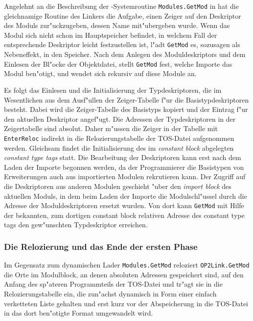 Angelehnt an die Beschreibung der \oberon-Systemroutine {\tt Modules.GetMod}
in \cite[S.~867f]{oberonSystem} hat die gleichnamige Routine des Linkers
die Aufgabe, einen Zeiger auf den Deskriptor des Moduls zur"uckzugeben,
dessen Name mit"ubergeben wurde.
Wenn das Modul sich nicht schon im Hauptspeicher befindet, in welchem Fall
der entsprechende Deskriptor leicht festzustellen ist, l"adt {\tt GetMod} es,
sozusagen als Nebeneffekt, in den Speicher.
Nach dem Anlegen des Moduldeskriptors und dem Einlesen der Bl"ocke der
Objektdatei, stellt {\tt GetMod} fest, welche Importe das Modul ben"otigt,
und wendet sich rekursiv auf diese Module an.

Es folgt das Einlesen und die Initialisierung der Typdeskriptoren, die
im Wesentlichen aus dem Ausf"ullen der Zeiger-Tabelle f"ur die Basistypdeskriptoren
besteht.
Dabei wird die Zeiger-Tabelle des Basistyps kopiert und der Eintrag f"ur
den aktuellen Deskriptor angef"ugt.
Die Adressen der Typdeskriptoren in der Zeigertabelle sind absolut.
Daher m"ussen die Zeiger in der Tabelle mit {\tt EnterReloc} indirekt in die
Relozierungstabelle der TOS-Datei aufgenommen werden.
Gleichsam findet die Initialisierung des im {\it constant block\/} abgelegten
{\it constant type tags\/} statt.
Die Bearbeitung der Deskriptoren kann erst nach dem Laden der Importe
begonnen werden, da der Programmierer die Basistypen von Erweiterungen auch
aus importierten Modulen rekrutieren kann.
Der Zugriff auf die Deskriptoren aus anderen Modulen geschieht "uber den
{\it import block\/} des aktuellen Moduls, in dem beim Laden der Importe
die Modulschl"ussel durch die Adresse der Moduldeskriptoren ersetzt wurden.
Von dort kann {\tt GetMod} mit Hilfe der bekannten, zum dortigen constant block
relativen Adresse des constant type tags den gew"unschten Typdeskriptor
erreichen.

\subsubsection{Die Relozierung und das Ende der ersten Phase}

Im Gegensatz zum dynamischen Lader {\tt Modules.GetMod}
reloziert {\tt OP2Link.GetMod} die Orte im Modulblock, an denen absoluten Adressen
gespeichert sind, auf den Anfang des sp"ateren Programmteils der TOS-Datei
und tr"agt sie in die Relozierungstabelle ein, die zun"achst dynamisch
in Form einer einfach verketteten Liste gehalten und erst kurz vor der
Abspeicherung in die TOS-Datei in das dort ben"otigte Format umgewandelt wird.

